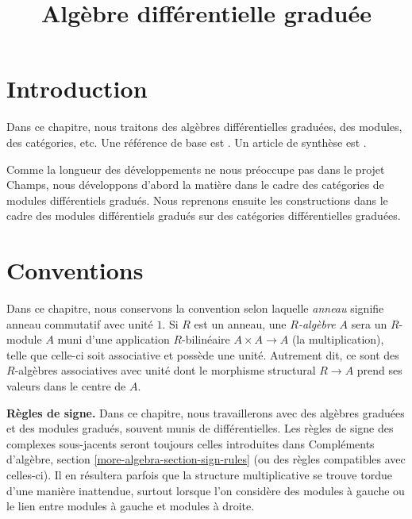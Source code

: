 

%


\title{Algèbre différentielle graduée}


\maketitle

\label{section-phantom}

\tableofcontents

\section{Introduction}
\label{section-introduction}

\noindent
Dans ce chapitre, nous traitons des algèbres différentielles graduées, des modules,
des catégories, etc. Une référence de base est \cite{Keller-Deriving}.
Un article de synthèse est \cite{Keller-survey}.

\medskip\noindent
Comme la longueur des développements ne nous préoccupe pas dans le projet Champs,
nous développons d'abord la matière dans le cadre des catégories de modules
différentiels gradués. Nous reprenons ensuite les constructions dans le cadre des
modules différentiels gradués sur des catégories différentielles graduées.



\section{Conventions}
\label{section-conventions}

\noindent
Dans ce chapitre, nous conservons la convention selon laquelle {\it anneau} signifie
anneau commutatif avec unité $1$. Si $R$ est un anneau, une {\it $R$-algèbre $A$}
sera un $R$-module $A$ muni d'une application $R$-bilinéaire $A \times A \to A$
(la multiplication), telle que celle-ci soit associative et possède une unité.
Autrement dit, ce sont des $R$-algèbres associatives avec unité
dont le morphisme structural $R \to A$ prend ses valeurs dans le centre de $A$.

\medskip\noindent
{\bf Règles de signe.} Dans ce chapitre, nous travaillerons avec des algèbres graduées
et des modules gradués, souvent munis de différentielles. Les règles de signe des
complexes sous-jacents seront toujours celles introduites dans
Compléments d'algèbre, section \ref{more-algebra-section-sign-rules} (ou des règles compatibles avec celles-ci).
Il en résultera parfois que la structure multiplicative se trouve tordue d'une manière
inattendue, surtout lorsque l'on considère des modules à gauche
ou le lien entre modules à gauche et modules à droite.





